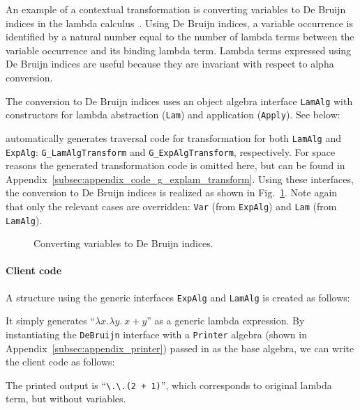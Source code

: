 An example of a contextual transformation is converting variables to De Bruijn indices in the lambda calculus~\cite{deBruijn1972381}.
Using De Bruijn indices, a variable occurrence is identified by a natural number equal to the number of lambda terms between the variable occurrence and its binding lambda term.
Lambda terms expressed using De Bruijn indices are useful because they are invariant with respect to alpha conversion.

The conversion to De Bruijn indices uses an object algebra interface
\lstinline{LamAlg} with constructors for lambda abstraction
(\lstinline{Lam}) and application (\lstinline{Apply}). See below:


\name automatically generates traversal code for transformation for both
\lstinline{LamAlg} and \lstinline{ExpAlg}:
\lstinline{G_LamAlgTransform} and \lstinline{G_ExpAlgTransform},
respectively. For space reasons
the generated transformation code is omitted here, but can be found
in Appendix~\ref{subsec:appendix_code_g_explam_transform}. Using these
interfaces, the conversion to De Bruijn indices is
  realized as shown in Fig.~\ref{DeBruijn}. Note again that only the
  relevant cases are overridden: \lstinline{Var} (from
  \lstinline{ExpAlg}) and \lstinline{Lam} (from \lstinline{LamAlg}).


\begin{figure}[t]
\nocaptionrule
\caption{Converting variables to De Bruijn indices.}
\label{DeBruijn}
\end{figure}

\paragraph{Client code} A structure using the generic interfaces
\lstinline{ExpAlg} and \lstinline{LamAlg} is created as follows:


\noindent It simply generates ``$\lambda x.\lambda y.~x+y$'' as a generic lambda expression.
By instantiating the \lstinline{DeBruijn} interface with a
\lstinline{Printer} algebra (shown in Appendix~\ref{subsec:appendix_printer}) passed
in as the base algebra, we can write the client code as follows:


\noindent The printed output is ``\lstinline{\.\.(2 + 1)}'', which corresponds to original lambda term, but without variables. 

